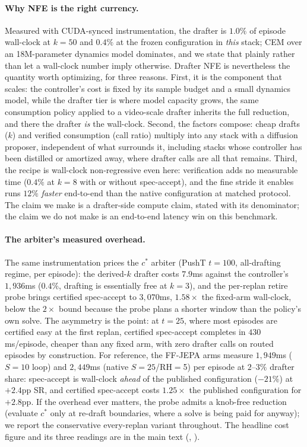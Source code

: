 \documentclass{article}
\begin{document}
\paragraph{Why NFE is the right currency.} Measured with CUDA-synced
instrumentation, the drafter is $1.0\%$ of episode wall-clock at $k{=}50$ and $0.4\%$
at the frozen configuration in \emph{this} stack; CEM over an 18M-parameter
dynamics model dominates, and we state that plainly rather than let a wall-clock
number imply otherwise. Drafter NFE is nevertheless the quantity worth optimizing,
for three reasons. First, it is the component that scales: the controller's cost is
fixed by its sample budget and a small dynamics model, while the drafter tier is
where model capacity grows, the same consumption policy applied to a video-scale
drafter inherits the full reduction, and there the drafter \emph{is} the wall-clock.
Second, the factors compose: cheap drafts ($k$) and verified consumption (call ratio)
multiply into any stack with a diffusion proposer, independent of what surrounds it, including stacks whose controller has been distilled or amortized away, where
drafter calls are all that remains. Third, the recipe is wall-clock non-regressive
even here: verification adds no measurable time ($0.4\%$ at $k{=}8$ with or without
spec-accept), and the fine stride it enables runs $12\%$ \emph{faster} end-to-end
than the native configuration at matched protocol. The claim we make is a
drafter-side compute claim, stated with its denominator; the claim we do not make is
an end-to-end latency win on this benchmark.

\paragraph{The arbiter's measured overhead.} The same instrumentation prices the
$c^{*}$ arbiter (PushT $t{=}100$, all-drafting regime, per episode): the derived-$k$
drafter costs $7.9$ms against the controller's $1{,}936$ms ($0.4\%$, drafting is
essentially free at $k{=}3$), and the per-replan retire probe brings certified
spec-accept to $3{,}070$ms, $1.58\times$ the fixed-arm wall-clock, below the $2\times$
bound because the probe plans a shorter window than the policy's own solve. The
asymmetry is the point: at $t{=}25$, where most episodes are certified easy at the
first replan, certified spec-accept completes in $430$ms/episode, cheaper than any
fixed arm, with zero drafter calls on routed episodes by construction. For
reference, the FF-JEPA arms measure $1{,}949$ms ($S{=}10$ loop) and $2{,}449$ms
(native $S{=}25$/RH$=$5) per episode at $2$--$3\%$ drafter share: spec-accept is
wall-clock \emph{ahead} of the published configuration ($-21\%$) at $+2.4$pp SR, and
certified spec-accept costs $1.25\times$ the published configuration for $+2.8$pp. If
the overhead ever matters, the probe admits a knob-free reduction (evaluate $c^{*}$
only at re-draft boundaries, where a solve is being paid for anyway); we report the
conservative every-replan variant throughout. The headline cost figure and its
three readings are in the main text (, ).
\end{document}
